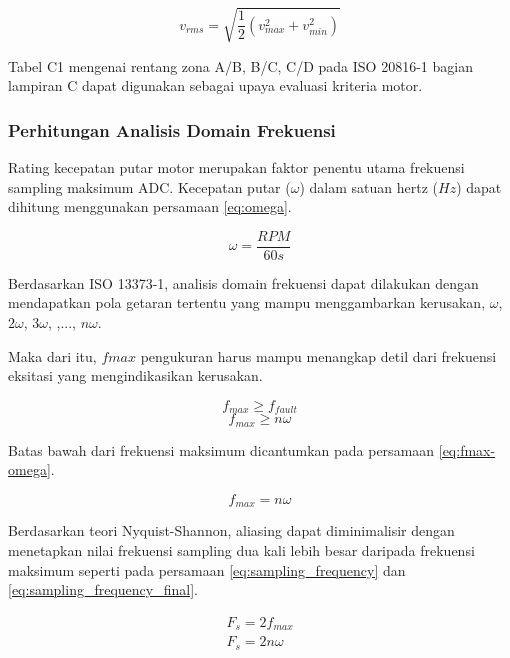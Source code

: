 \documentclass{elsinta}
\begin{document}
    \begin{equation}
        \label{eq:rms_2}
        v_{rms} = \sqrt{\frac{1}{2} (v_{max}^2 + v_{min}^2)} 
    \end{equation}

    Tabel C1 mengenai rentang zona A/B,
    B/C, C/D pada ISO 20816-1 bagian lampiran 
    C dapat digunakan sebagai upaya  evaluasi
    kriteria motor.

\subsubsection{Perhitungan Analisis Domain Frekuensi}
    Rating kecepatan putar motor merupakan
    faktor penentu utama frekuensi sampling 
    maksimum ADC. Kecepatan putar ($\omega$) dalam satuan
    hertz ($Hz$) dapat dihitung menggunakan persamaan \ref{eq:omega}.
    
    \begin{equation}
        \label{eq:omega}
        \omega=\frac{RPM}{60 s}
    \end{equation}

    Berdasarkan ISO 13373-1, analisis domain frekuensi
    dapat dilakukan dengan mendapatkan pola
    getaran tertentu yang mampu menggambarkan kerusakan,
    $\omega$, $2 \omega$, $3 \omega$, 
    ,..., $n \omega$.

    Maka dari itu, $fmax$ pengukuran harus mampu menangkap detil
    dari frekuensi eksitasi yang mengindikasikan kerusakan.

    \[f_{max} \geq f_{fault}\] 
    \[f_{max} \geq n \omega\]

    Batas bawah dari frekuensi maksimum dicantumkan
    pada persamaan \ref{eq:fmax-omega}.

    \begin{equation}
        \label{eq:fmax-omega}
        f_{max} = n \omega
    \end{equation}

    Berdasarkan teori Nyquist-Shannon, aliasing
    dapat diminimalisir dengan menetapkan
    nilai frekuensi sampling dua kali lebih besar
    daripada frekuensi maksimum seperti pada persamaan
    \ref{eq:sampling_frequency} dan \ref{eq:sampling_frequency_final}.

    \begin{align}
        \label{eq:sampling_frequency}
        F_{s} = 2 f_{max}\\
        \label{eq:sampling_frequency_final}
        F_{s} = 2 n \omega
    \end{align}
\end{document}

